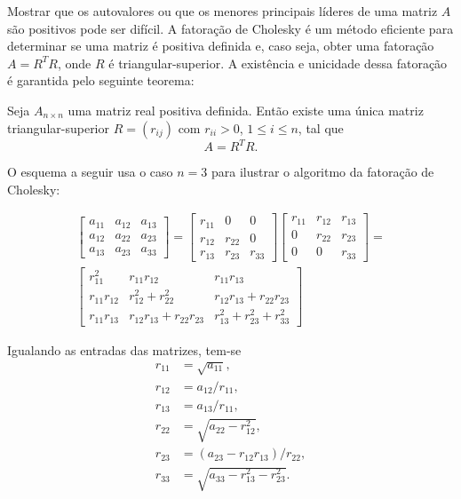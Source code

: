 \documentclass{article}
\begin{document}
Mostrar que os autovalores ou que os menores principais líderes de uma matriz \(A\) são positivos pode ser difícil. A fatoração de Cholesky é um método eficiente para determinar se uma matriz é positiva definida e, caso seja, obter uma fatoração \(A = R^T R\), onde \(R\) é triangular-superior. A existência e unicidade dessa fatoração é garantida pelo seguinte teorema:

\begin{thm}
    Seja \(A_{n \times n}\) uma matriz real positiva definida. Então existe uma única matriz triangular-superior \(R = (r_{ij})\) com \(r_{ii} > 0\), \(1 \leq i \leq n\), tal que
    \[
        A = R^T R.
    \]
\end{thm}

O esquema a seguir usa o caso \(n=3\) para ilustrar o algoritmo da fatoração de Cholesky:

\begin{tcolorbox}[title=Computando a fatoração de Cholesky]
    \begin{multline}
        \begin{bmatrix}
            a_{11} & a_{12} & a_{13} \\
            a_{12} & a_{22} & a_{23} \\
            a_{13} & a_{23} & a_{33}
        \end{bmatrix} = 
        \begin{bmatrix}
            r_{11} & 0 & 0 \\
            r_{12} & r_{22} & 0 \\
            r_{13} & r_{23} & r_{33}
        \end{bmatrix}
        \begin{bmatrix}
            r_{11} & r_{12} & r_{13} \\
            0 & r_{22} & r_{23} \\
            0 & 0 & r_{33}
        \end{bmatrix} = \\
        \begin{bmatrix}
            r_{11}^2 & r_{11}r_{12} & r_{11}r_{13} \\
            r_{11}r_{12} & r_{12}^2 + r_{22}^2 & r_{12}r_{13} + r_{22}r_{23} \\
            r_{11}r_{13} & r_{12}r_{13} + r_{22}r_{23} & r_{13}^2 + r_{23}^2 + r_{33}^2
        \end{bmatrix}   
    \end{multline}

    Igualando as entradas das matrizes, tem-se
    \begin{align*}
        r_{11} &= \sqrt{a_{11}}, \\
        r_{12} &= a_{12}/r_{11}, \\
        r_{13} &= a_{13}/r_{11}, \\
        r_{22} &= \sqrt{a_{22} - r_{12}^2}, \\
        r_{23} &= (a_{23} - r_{12}r_{13})/r_{22}, \\
        r_{33} &= \sqrt{a_{33} - r_{13}^2 - r_{23}^2}.
    \end{align*}
\end{tcolorbox}
\end{document}
